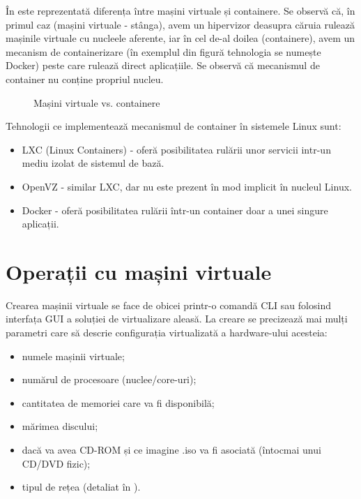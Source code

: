 În  este reprezentată
diferența între mașini virtuale și containere. Se observă că, în primul caz
(mașini virtuale - stânga), avem un hipervizor deasupra căruia rulează mașinile
virtuale cu nucleele aferente, iar în cel de-al doilea (containere), avem un
mecanism de containerizare (în exemplul din figură tehnologia se numește Docker)
peste care rulează direct aplicațiile. Se observă că mecanismul de container nu
conține propriul nucleu.

\begin{figure}[htbp]
	\centering
	\def\svgwidth{\columnwidth}
	
	\caption{Mașini virtuale vs. containere}
	\label{fig:vm:vm-container}
\end{figure}

Tehnologii ce implementează mecanismul de container în sistemele Linux sunt:

\begin{itemize}
	\item LXC  (Linux Containers) - oferă posibilitatea
		rulării unor servicii intr-un mediu izolat de sistemul de bază.
	\item OpenVZ - similar LXC, dar nu este prezent în mod implicit în
		nucleul Linux.
	\item Docker - oferă posibilitatea rulării într-un container doar a unei
		singure aplicații.
\end{itemize}

\section{Operații cu mașini virtuale}
\label{sec:vm:ops}

Crearea mașinii virtuale se face de obicei printr-o comandă CLI sau
folosind interfața GUI a soluției de virtualizare aleasă. La creare
se precizează mai mulți parametri care să descrie configurația
virtualizată a hardware-ului acesteia:

\begin{itemize}
	\item numele mașinii virtuale;
	\item numărul de procesoare (nuclee/core-uri);
	\item cantitatea de memoriei care va fi disponibilă;
	\item mărimea discului;
	\item dacă va avea CD-ROM și ce imagine .iso va fi asociată (întocmai
		unui CD/DVD fizic);
        \item tipul de rețea (detaliat în  ).
\end{itemize}

